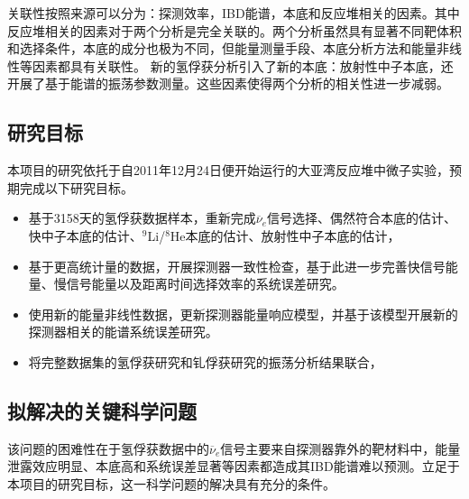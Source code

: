 \documentclass[a4paper,zihao=-4]{article}
\begin{document}
关联性按照来源可以分为：探测效率，IBD能谱，本底和反应堆相关的因素。其中反应堆相关的因素对于两个分析是完全关联的。两个分析虽然具有显著不同靶体积和选择条件，本底的成分也极为不同，但能量测量手段、本底分析方法和能量非线性等因素都具有关联性。 新的氢俘获分析引入了新的本底：放射性中子本底，还开展了基于能谱的振荡参数测量。这些因素使得两个分析的相关性进一步减弱。

\subsection{研究目标}
本项目的研究依托于自2011年12月24日便开始运行的大亚湾反应堆中微子实验，预期完成以下研究目标。
\begin{itemize}
	\item {} 基于3158天的氢俘获数据样本，重新完成$\overline{\nu}_e$信号选择、偶然符合本底的估计、快中子本底的估计、$^9$Li/$^8$He本底的估计、放射性中子本底的估计，
	\item {}基于更高统计量的数据，开展探测器一致性检查，基于此进一步完善快信号能量、慢信号能量以及距离时间选择效率的系统误差研究。
	\item {}使用新的能量非线性数据，更新探测器能量响应模型，并基于该模型开展新的探测器相关的能谱系统误差研究。
	\item {}将完整数据集的氢俘获研究和钆俘获研究的振荡分析结果联合，
\end{itemize}

\subsection{拟解决的关键科学问题}

该问题的困难性在于氢俘获数据中的$\overline{\nu}_e$信号主要来自探测器靠外的靶材料中，能量泄露效应明显、本底高和系统误差显著等因素都造成其IBD能谱难以预测。立足于本项目的研究目标，这一科学问题的解决具有充分的条件。
\end{document}
